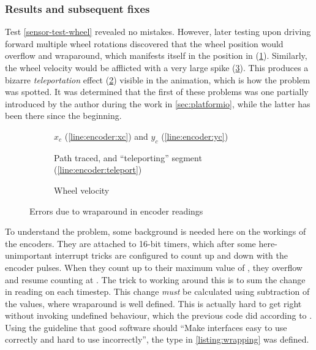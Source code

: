\documentclass[main.tex]{subfiles}
\begin{document}
		\subsubsection{Results and subsequent fixes}

		Test \ref{sensor-test-wheel} revealed no mistakes.
		However, later testing upon driving forward multiple wheel rotations discovered that the wheel position would overflow and wraparound, which manifests itself in the position in (\cref{fig:bad-wheel:pos}). Similarly, the wheel velocity would be afflicted with a very large spike (\cref{fig:bad-wheel:vel}). This produces a bizarre \emph{teleportation} effect (\cref{fig:bad-wheel:tele}) visible in the animation, which is how the problem was spotted.
		It was determined that the first of these problems was one partially introduced by the author during the work in \cref{sec:platformio}, while the latter has been there since the beginning.

		\begin{figure}
			\newlength{\mypadding}
			\setlength{\mypadding}{1.5cm}
			\newlength{\mywidth}
			\setlength{\mywidth}{(\linewidth-2\mypadding)/3}
			\begin{subfigure}[t]{\mywidth}
				
				\caption{$x_c$ (\ref{line:encoder:xc}) and $y_c$ (\ref{line:encoder:yc})}
				\label{fig:bad-wheel:pos}
			\end{subfigure}\hfill
			\begin{subfigure}[t]{\mywidth}
				
				\caption{Path traced, and \enquote{teleporting} segment (\ref{line:encoder:teleport})}
				\label{fig:bad-wheel:tele}
			\end{subfigure}\hfill
			\begin{subfigure}[t]{\mywidth}
				
				\caption{Wheel velocity}
				\label{fig:bad-wheel:vel}
			\end{subfigure}
			\caption{Errors due to wraparound in encoder readings}
			\label{fig:bad-wheel}
		\end{figure}

		To understand the problem, some background is needed here on the workings of the encoders.
		They are attached to 16-bit timers, which after some here-unimportant interrupt tricks are configured to count up and down with the encoder pulses. When they count up to their maximum value of , they overflow and resume counting at .
		The trick to working around this is to sum the change in reading on each timestep. This change \emph{must} be calculated using  subtraction of the values, where wraparound is well defined. This is actually hard to get right without invoking undefined behaviour, which the previous code did according to \cite[Paragraph~5/4]{cpp-standard}.
		Using the guideline that good software should \enquote{Make interfaces easy to use correctly and hard to use incorrectly}\cite{meyers2004most}, the type in \cref{listing:wrapping} was defined.
\end{document}
